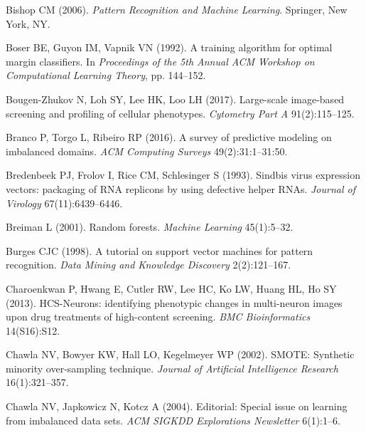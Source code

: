 \begin{thebibliography}{110}
Bishop CM (2006). \emph{Pattern Recognition and Machine Learning}. Springer,
  New York, NY.

Boser BE, Guyon IM, Vapnik VN (1992). A training algorithm for optimal margin
  classifiers. In \emph{Proceedings of the 5th Annual ACM Workshop on
  Computational Learning Theory}, pp. 144--152.

Bougen-Zhukov N, Loh SY, Lee HK, Loo LH (2017). Large-scale image-based
  screening and profiling of cellular phenotypes. \emph{Cytometry Part A}
  91(2):115--125.

Branco P, Torgo L, Ribeiro RP (2016). A survey of predictive modeling on
  imbalanced domains. \emph{ACM Computing Surveys} 49(2):31:1--31:50.

{\color{red}Bredenbeek PJ, Frolov I, Rice CM, Schlesinger S (1993). Sindbis virus
  expression vectors: packaging of {RNA} replicons by using defective helper
  {RNAs}. \emph{Journal of Virology} 67(11):6439--6446.}

Breiman L (2001). Random forests. \emph{Machine Learning} 45(1):5--32.

Burges CJC (1998). A tutorial on support vector machines for pattern
  recognition. \emph{Data Mining and Knowledge Discovery} 2(2):121--167.

Charoenkwan P, Hwang E, Cutler RW, Lee HC, Ko LW, Huang HL, Ho SY (2013).
  {HCS-Neurons}: identifying phenotypic changes in multi-neuron images upon
  drug treatments of high-content screening. \emph{BMC Bioinformatics}
  14(S16):S12.

Chawla NV, Bowyer KW, Hall LO, Kegelmeyer WP (2002). {SMOTE}: Synthetic
  minority over-sampling technique. \emph{Journal of Artificial Intelligence
  Research} 16(1):321--357.

Chawla NV, Japkowicz N, Kotcz A (2004). Editorial: Special issue on learning
  from imbalanced data sets. \emph{ACM SIGKDD Explorations Newsletter}
  6(1):1--6.


\end{thebibliography}
